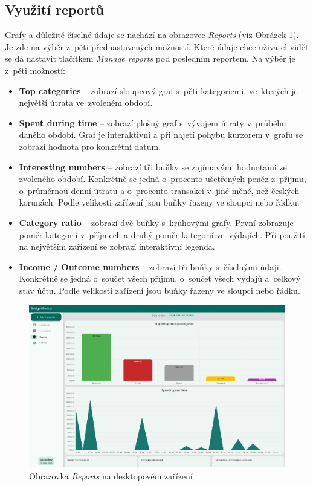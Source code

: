 \documentclass[
  biblatex,
  figures=true,
  tables=false,
  glossaries,
  index
]{kidiplom}
\begin{document}
\subsection{Využití reportů}
Grafy a důležité číselné údaje se nachází na obrazovce \textit{Reports} (viz \hyperref[fig:reports]{Obrázek \ref{fig:reports}}). Je zde na výběr z~pěti přednastavených možností. Které údaje chce uživatel vidět se dá nastavit tlačítkem \textit{Manage reports} pod posledním reportem. Na výběr je z~pěti možností:
\begin{itemize}
  \item \textbf{Top categories} -- zobrazí sloupcový graf s~pěti kategoriemi, ve~kterých je největší útrata ve~zvoleném období.
  \item \textbf{Spent during time} -- zobrazí plošný graf s~vývojem útraty v~průběhu daného období. Graf je interaktivní a při najetí pohybu kurzorem v~grafu se zobrazí hodnota pro konkrétní datum.
  \item \textbf{Interesting numbers} -- zobrazí tři buňky se zajímavými hodnotami ze zvoleného období. Konkrétně se jedná o~procento ušetřených peněz z~přijmu, o~průměrnou denní útratu a o~procento transakcí v~jiné měně, než českých korunách. Podle velikosti zařízení jsou buňky řazeny ve sloupci nebo řádku.
  \item \textbf{Category ratio} -- zobrazí dvě buňky s~kruhovými grafy. První zobrazuje poměr kategorií v~příjmech a druhý poměr kategorií ve~výdajích. Při použití na největším zařízení se zobrazí interaktivní legenda.
  \item \textbf{Income / Outcome numbers} -- zobrazí tři buňky s~číselnými údaji. Konkrétně se jedná o~součet všech příjmů, o~součet všech výdajů a~celkový stav účtu. Podle velikosti zařízení jsou buňky řazeny ve sloupci nebo řádku.
\end{itemize}

\begin{figure}
  \centering
  \includegraphics[width=\textwidth]{images/reports-large.png}
  \caption{Obrazovka \textit{Reports} na desktopovém zařízení}
  \label{fig:reports}
\end{figure}
\end{document}
